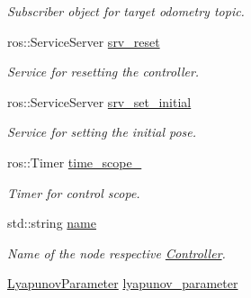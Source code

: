 \begin{DoxyCompactItemize}
\begin{DoxyCompactList}\small\item\em Subscriber object for target odometry topic. \end{DoxyCompactList}\item 
ros\+::\+Service\+Server \hyperlink{classController_a06c03b4a779d0c6cfcacef97eb36c6bd}{srv\+\_\+reset}\hypertarget{classController_a06c03b4a779d0c6cfcacef97eb36c6bd}{}\label{classController_a06c03b4a779d0c6cfcacef97eb36c6bd}

\begin{DoxyCompactList}\small\item\em Service for resetting the controller. \end{DoxyCompactList}\item 
ros\+::\+Service\+Server \hyperlink{classController_a64d3c8a18c05e8d4ab47598875a09bc1}{srv\+\_\+set\+\_\+initial}\hypertarget{classController_a64d3c8a18c05e8d4ab47598875a09bc1}{}\label{classController_a64d3c8a18c05e8d4ab47598875a09bc1}

\begin{DoxyCompactList}\small\item\em Service for setting the initial pose. \end{DoxyCompactList}\item 
ros\+::\+Timer \hyperlink{classController_a96e34ca6ebe5b7c8035982ff98270f4b}{time\+\_\+scope\+\_\+}\hypertarget{classController_a96e34ca6ebe5b7c8035982ff98270f4b}{}\label{classController_a96e34ca6ebe5b7c8035982ff98270f4b}

\begin{DoxyCompactList}\small\item\em Timer for control scope. \end{DoxyCompactList}\item 
std\+::string \hyperlink{classController_af81f22d8b64d915769acfb8e8d89e0c8}{name}\hypertarget{classController_af81f22d8b64d915769acfb8e8d89e0c8}{}\label{classController_af81f22d8b64d915769acfb8e8d89e0c8}

\begin{DoxyCompactList}\small\item\em Name of the node respective \hyperlink{classController}{Controller}. \end{DoxyCompactList}\item 
\hyperlink{structController_1_1LyapunovParameter}{Lyapunov\+Parameter} \hyperlink{classController_a8069db2319ff64d65607b1aa897d3069}{lyapunov\+\_\+parameter}\hypertarget{classController_a8069db2319ff64d65607b1aa897d3069}{}\label{classController_a8069db2319ff64d65607b1aa897d3069}


\end{DoxyCompactItemize}
